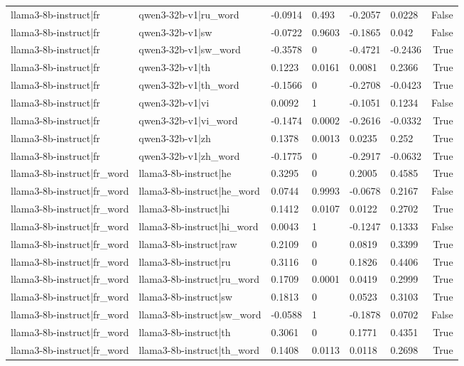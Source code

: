 \begin{table}
\begin{tabular}{llllllr}
llama3-8b-instruct|fr & qwen3-32b-v1|ru_word & -0.0914 & 0.493 & -0.2057 & 0.0228 & False \\
llama3-8b-instruct|fr & qwen3-32b-v1|sw & -0.0722 & 0.9603 & -0.1865 & 0.042 & False \\
llama3-8b-instruct|fr & qwen3-32b-v1|sw_word & -0.3578 & 0 & -0.4721 & -0.2436 & True \\
llama3-8b-instruct|fr & qwen3-32b-v1|th & 0.1223 & 0.0161 & 0.0081 & 0.2366 & True \\
llama3-8b-instruct|fr & qwen3-32b-v1|th_word & -0.1566 & 0 & -0.2708 & -0.0423 & True \\
llama3-8b-instruct|fr & qwen3-32b-v1|vi & 0.0092 & 1 & -0.1051 & 0.1234 & False \\
llama3-8b-instruct|fr & qwen3-32b-v1|vi_word & -0.1474 & 0.0002 & -0.2616 & -0.0332 & True \\
llama3-8b-instruct|fr & qwen3-32b-v1|zh & 0.1378 & 0.0013 & 0.0235 & 0.252 & True \\
llama3-8b-instruct|fr & qwen3-32b-v1|zh_word & -0.1775 & 0 & -0.2917 & -0.0632 & True \\
llama3-8b-instruct|fr_word & llama3-8b-instruct|he & 0.3295 & 0 & 0.2005 & 0.4585 & True \\
llama3-8b-instruct|fr_word & llama3-8b-instruct|he_word & 0.0744 & 0.9993 & -0.0678 & 0.2167 & False \\
llama3-8b-instruct|fr_word & llama3-8b-instruct|hi & 0.1412 & 0.0107 & 0.0122 & 0.2702 & True \\
llama3-8b-instruct|fr_word & llama3-8b-instruct|hi_word & 0.0043 & 1 & -0.1247 & 0.1333 & False \\
llama3-8b-instruct|fr_word & llama3-8b-instruct|raw & 0.2109 & 0 & 0.0819 & 0.3399 & True \\
llama3-8b-instruct|fr_word & llama3-8b-instruct|ru & 0.3116 & 0 & 0.1826 & 0.4406 & True \\
llama3-8b-instruct|fr_word & llama3-8b-instruct|ru_word & 0.1709 & 0.0001 & 0.0419 & 0.2999 & True \\
llama3-8b-instruct|fr_word & llama3-8b-instruct|sw & 0.1813 & 0 & 0.0523 & 0.3103 & True \\
llama3-8b-instruct|fr_word & llama3-8b-instruct|sw_word & -0.0588 & 1 & -0.1878 & 0.0702 & False \\
llama3-8b-instruct|fr_word & llama3-8b-instruct|th & 0.3061 & 0 & 0.1771 & 0.4351 & True \\
llama3-8b-instruct|fr_word & llama3-8b-instruct|th_word & 0.1408 & 0.0113 & 0.0118 & 0.2698 & True \\

\end{tabular}
\end{table}
